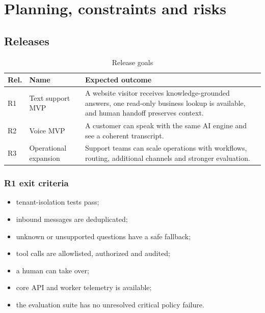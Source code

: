 \chapter{Planning, constraints and risks}\label{chap:planning}

\section{Releases}
\begin{table}[htbp]
\centering\caption{Release goals}\label{tab:releases}
\begin{tabular}{@{}p{1.2cm}p{4cm}p{10.8cm}@{}}
\toprule \textbf{Rel.} & \textbf{Name} & \textbf{Expected outcome} \\ \midrule
R1 & Text support MVP & A website visitor receives knowledge-grounded answers, one read-only business lookup is available, and human handoff preserves context. \\
R2 & Voice MVP & A customer can speak with the same AI engine and see a coherent transcript. \\
R3 & Operational expansion & Support teams can scale operations with workflows, routing, additional channels and stronger evaluation. \\
\bottomrule
\end{tabular}
\end{table}


\subsection{R1 exit criteria}
\begin{itemize}
  \item tenant-isolation tests pass;
  \item inbound messages are deduplicated;
  \item unknown or unsupported questions have a safe fallback;
  \item tool calls are allowlisted, authorized and audited;
  \item a human can take over;
  \item core API and worker telemetry is available;
  \item the evaluation suite has no unresolved critical policy failure.
\end{itemize}

